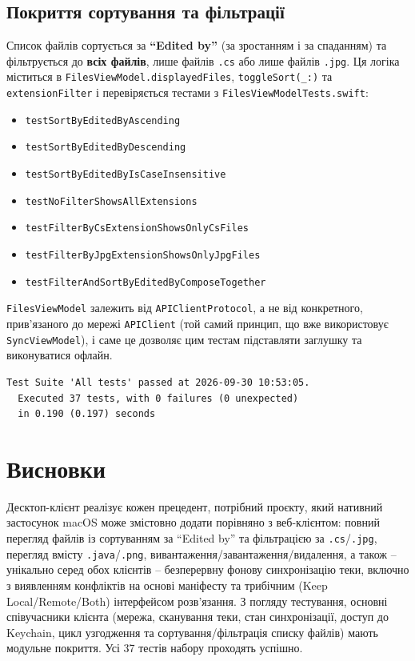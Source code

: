 \documentclass[12pt,a4paper]{article}
\begin{document}
\subsection{Покриття сортування та фільтрації}
\label{sec:variant}

Список файлів сортується за \textbf{``Edited by''} (за зростанням і за спаданням) та фільтрується до \textbf{всіх файлів}, лише файлів \texttt{.cs} або лише файлів \texttt{.jpg}. Ця логіка міститься в \texttt{FilesViewModel.displayedFiles}, \texttt{toggleSort(\_:)} та \texttt{extensionFilter} і перевіряється тестами з \texttt{FilesViewModelTests.swift}:

\begin{itemize}[nosep]
    \item[] \texttt{testSortByEditedByAscending}
    \item[] \texttt{testSortByEditedByDescending}
    \item[] \texttt{testSortByEditedByIsCaseInsensitive}
    \item[] \texttt{testNoFilterShowsAllExtensions}
    \item[] \texttt{testFilterByCsExtensionShowsOnlyCsFiles}
    \item[] \texttt{testFilterByJpgExtensionShowsOnlyJpgFiles}
    \item[] \texttt{testFilterAndSortByEditedByComposeTogether}
\end{itemize}

\texttt{FilesViewModel} залежить від \texttt{APIClientProtocol}, а не від конкретного, прив'язаного до мережі \texttt{APIClient} (той самий принцип, що вже використовує \texttt{SyncViewModel}), і саме це дозволяє цим тестам підставляти заглушку та виконуватися офлайн.

\begin{verbatim}
Test Suite 'All tests' passed at 2026-09-30 10:53:05.
  Executed 37 tests, with 0 failures (0 unexpected)
  in 0.190 (0.197) seconds
\end{verbatim}

\section{Висновки}

Десктоп-клієнт реалізує кожен прецедент, потрібний проєкту, який нативний застосунок macOS може змістовно додати порівняно з веб-клієнтом: повний перегляд файлів із сортуванням за ``Edited by'' та фільтрацією за \texttt{.cs}/\texttt{.jpg}, перегляд вмісту \texttt{.java}/\texttt{.png}, вивантаження/завантаження/видалення, а також -- унікально серед обох клієнтів -- безперервну фонову синхронізацію теки, включно з виявленням конфліктів на основі маніфесту та трибічним (Keep Local/Remote/Both) інтерфейсом розв'язання. З погляду тестування, основні співучасники клієнта (мережа, сканування теки, стан синхронізації, доступ до Keychain, цикл узгодження та сортування/фільтрація списку файлів) мають модульне покриття. Усі 37 тестів набору проходять успішно.
\end{document}
